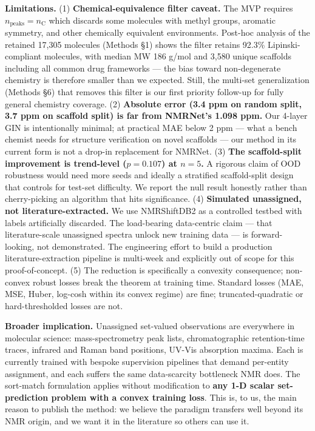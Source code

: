 \documentclass[
]{article}
\begin{document}
\textbf{Limitations.} (1) \textbf{Chemical-equivalence filter caveat.}
The MVP requires \(n_{\text{peaks}} = n_{\text{C}}\) which discards some
molecules with methyl groups, aromatic symmetry, and other chemically
equivalent environments. Post-hoc analysis of the retained 17,305
molecules (Methods §1) shows the filter retains 92.3\%
Lipinski-compliant molecules, with median MW 186 g/mol and 3,580 unique
scaffolds including all common drug frameworks --- the bias toward
non-degenerate chemistry is therefore smaller than we expected. Still,
the multi-set generalization (Methods §6) that removes this filter is
our first priority follow-up for fully general chemistry coverage. (2)
\textbf{Absolute error (3.4 ppm on random split, 3.7 ppm on scaffold
split) is far from NMRNet's 1.098 ppm.} Our 4-layer GIN is intentionally
minimal; at practical MAE below 2 ppm --- what a bench chemist needs for
structure verification on novel scaffolds --- our method in its current
form is not a drop-in replacement for NMRNet. (3) \textbf{The
scaffold-split improvement is trend-level (\(p=0.107\)) at \(n=5\).} A
rigorous claim of OOD robustness would need more seeds and ideally a
stratified scaffold-split design that controls for test-set difficulty.
We report the null result honestly rather than cherry-picking an
algorithm that hits significance. (4) \textbf{Simulated unassigned, not
literature-extracted.} We use NMRShiftDB2 as a controlled testbed with
labels artificially discarded. The load-bearing data-centric claim ---
that literature-scale unassigned spectra unlock new training data --- is
forward-looking, not demonstrated. The engineering effort to build a
production literature-extraction pipeline is multi-week and explicitly
out of scope for this proof-of-concept. (5) The reduction is
specifically a convexity consequence; non-convex robust losses break the
theorem at training time. Standard losses (MAE, MSE, Huber, log-cosh
within its convex regime) are fine; truncated-quadratic or
hard-thresholded losses are not.

\textbf{Broader implication.} Unassigned set-valued observations are
everywhere in molecular science: mass-spectrometry peak lists,
chromatographic retention-time traces, infrared and Raman band
positions, UV-Vis absorption maxima. Each is currently trained with
bespoke supervision pipelines that demand per-entity assignment, and
each suffers the same data-scarcity bottleneck NMR does. The sort-match
formulation applies without modification to \textbf{any 1-D scalar
set-prediction problem with a convex training loss}. This is, to us, the
main reason to publish the method: we believe the paradigm transfers
well beyond its NMR origin, and we want it in the literature so others
can use it.
\end{document}
